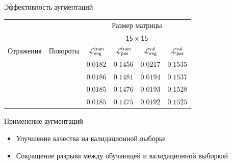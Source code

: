 \documentclass[9pt]{beamer}
\newcommand{\cmark}{\ding{51}}
\newcommand{\xmark}{\ding{55}}
\begin{document}
\begin{frame}{Эффективность аугментаций}
    \begin{table}
        \footnotesize
        \centering
        \begin{tabular}{cc|cccc}
            \toprule
            {} & {} & \multicolumn{4}{c}{\textsf{Размер матрицы}} \\
            \cmidrule(lr){3-6}
            {} & {} & \multicolumn{4}{c}{$\mathsf{15 \times 15}$} \\
            \midrule
            \textsf{Отражения} & \textsf{Повороты} & $\mathcal{L}_{\mathsf{eng}}^{\mathsf{train}}$ & $\mathcal{L}_{\mathsf{pos}}^{\mathsf{train}}$ & $\mathcal{L}_{\mathsf{eng}}^{\mathsf{val}}$ & $\mathcal{L}_{\mathsf{pos}}^{\mathsf{val}}$ \\
            \midrule
            \xmark & \xmark & $\mathsf{0.0182}$ & $\mathsf{0.1456}$ & $\mathsf{0.0217}$ & $\mathsf{0.1535}$ \\
            \cmark & \xmark & $\mathsf{0.0186}$ & $\mathsf{0.1481}$ & $\mathsf{0.0194}$ & $\mathsf{0.1537}$ \\
            \xmark & \cmark & $\mathsf{0.0185}$ & $\mathsf{0.1476}$ & $\mathsf{0.0193}$ & $\mathsf{0.1528}$ \\
            \cmark & \cmark & $\mathsf{0.0185}$ & $\mathsf{0.1475}$ & $\mathsf{0.0192}$ & $\mathsf{0.1525}$ \\        
            
            \bottomrule
        \end{tabular}
    \end{table}

    \begin{block}{Применение аугментаций}
        \begin{itemize}
            \item Улучшение качества на валидационной выборке
            \item Сокращение разрыва между обучающей и валидационной выборкой
        \end{itemize}
    \end{block}
\end{frame}
\end{document}
